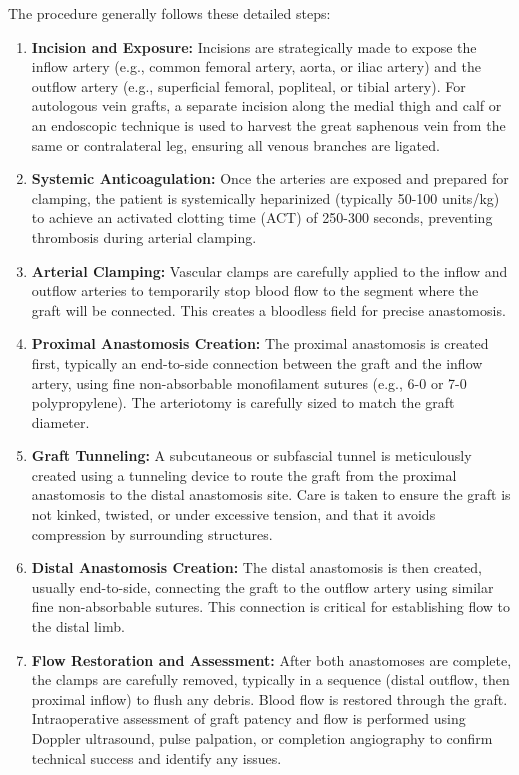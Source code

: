 The procedure generally follows these detailed steps:

\begin{enumerate}
  \item \textbf{Incision and Exposure:} Incisions are strategically made to expose the inflow artery (e.g., common femoral artery, aorta, or iliac artery) and the outflow artery (e.g., superficial femoral, popliteal, or tibial artery). For autologous vein grafts, a separate incision along the medial thigh and calf or an endoscopic technique is used to harvest the great saphenous vein from the same or contralateral leg, ensuring all venous branches are ligated.
  
  \item \textbf{Systemic Anticoagulation:} Once the arteries are exposed and prepared for clamping, the patient is systemically heparinized (typically 50-100 units/kg) to achieve an activated clotting time (ACT) of 250-300 seconds, preventing thrombosis during arterial clamping.
  
  \item \textbf{Arterial Clamping:} Vascular clamps are carefully applied to the inflow and outflow arteries to temporarily stop blood flow to the segment where the graft will be connected. This creates a bloodless field for precise anastomosis.
  
  \item \textbf{Proximal Anastomosis Creation:} The proximal anastomosis is created first, typically an end-to-side connection between the graft and the inflow artery, using fine non-absorbable monofilament sutures (e.g., 6-0 or 7-0 polypropylene). The arteriotomy is carefully sized to match the graft diameter.
  
  \item \textbf{Graft Tunneling:} A subcutaneous or subfascial tunnel is meticulously created using a tunneling device to route the graft from the proximal anastomosis to the distal anastomosis site. Care is taken to ensure the graft is not kinked, twisted, or under excessive tension, and that it avoids compression by surrounding structures.
  
  \item \textbf{Distal Anastomosis Creation:} The distal anastomosis is then created, usually end-to-side, connecting the graft to the outflow artery using similar fine non-absorbable sutures. This connection is critical for establishing flow to the distal limb.
  
  \item \textbf{Flow Restoration and Assessment:} After both anastomoses are complete, the clamps are carefully removed, typically in a sequence (distal outflow, then proximal inflow) to flush any debris. Blood flow is restored through the graft. Intraoperative assessment of graft patency and flow is performed using Doppler ultrasound, pulse palpation, or completion angiography to confirm technical success and identify any issues.
  

\end{enumerate}

